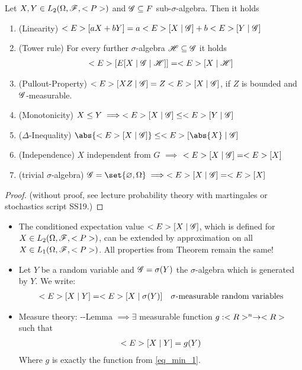 \begin{theorem} %
	Let $X,Y \in L_2(\Omega,\mathscr F,<P>)$ and $\mathscr{G} \subseteq F$ sub-$\sigma$-algebra. Then it holds 
	\begin{enumerate}
		\item (Linearity) $<E>[aX+bY] = a<E>[X\mid \mathscr{G}] + b<E>[Y\mid \mathscr{G}]$
		\item (Tower rule) For every further $\sigma$-algebra $\mathscr{H} \subseteq\mathscr{G}$ it holds
		\begin{align*}
			<E>[E[X\mid \mathscr{G} \mid \mathscr{H}]] = <E>[X\mid \mathscr{H}]
		\end{align*}
		\item (Pullout-Property) $<E>[XZ\mid \mathscr{G}] = Z<E>[X\mid \mathscr{G}]$, if $Z$ is bounded and $\mathscr{G}$-measurable.
		\item (Monotonicity) $X \le Y \implies <E>[X\mid \mathscr{G}] \le <E>[Y \mid \mathscr{G}]$
		\item ($\Delta$-Inequality) $\abs{\E[X\mid \G]} \le \E[\abs{X}\mid \G]$
		\item (Independence) $X$ independent from $G$ $\implies$ $<E>[X \mid \mathscr{G}] = <E>[X]$
		\item (trivial $\sigma$-algebra) $\G=\set{\emptyset, \O} \implies \E[X \mid \G] = \E[X]$ 
	\end{enumerate}
\end{theorem}
\begin{proof}
	(without proof, see lecture probability theory with martingales or stochastics script SS19.)
\end{proof}
\begin{*remark}
	\begin{itemize}
		\item The conditioned expectation value $<E>[X\mid \mathscr{G}]$, which is defined for $X \in L_2(\Omega,\mathscr F,<P>)$, can be extended by approximation on all $X\in L_1(\Omega,\mathscr F,<P>)$. All properties from Theorem  remain the same!
		\item Let $Y$ be a random variable and $\mathscr{G} = \sigma(Y)$ the $\sigma$-algebra which is generated by $Y$. We write:
		\begin{align*}
		<E>[X\mid Y] = <E>[X \mid \sigma(Y)] \quad \sigma\text{-measurable random variables}
		\end{align*}
		\item Measure theory: --Lemma $\implies \exists$ measurable function $g: <R>^n \to <R>$ such that
		\begin{align*}
		<E>[X\mid Y] = g(Y)
		\end{align*}
		Where $g$ is exactly the function from \eqref{eq_min_1}.
	\end{itemize}
\end{*remark}
